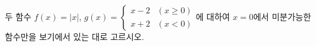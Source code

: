 두 함수 $f(x)=|x|$, $g(x)=\begin{cases} x-2 & (x\ge 0) \\ x+2 & (x<0) \end{cases}$에 대하여 $x=0$에서 미분가능한 함수만을 보기에서 있는 대로 고르시오. 
